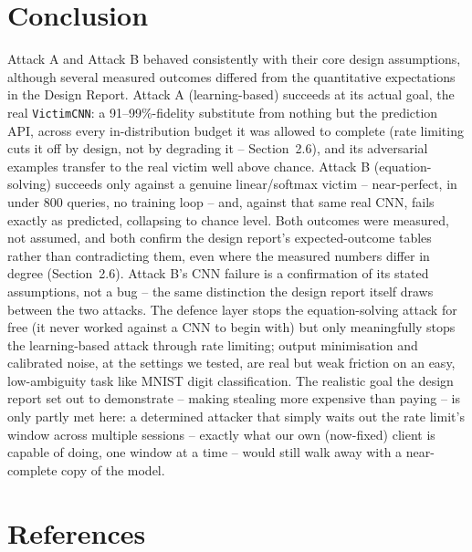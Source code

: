 \documentclass[11pt]{article}
\begin{document}
\section{Conclusion}

Attack A and Attack B behaved consistently with their core design
assumptions, although several measured outcomes differed from the
quantitative expectations in the Design Report. Attack A (learning-based) succeeds at its
actual goal, the real \texttt{VictimCNN}: a 91--99\%-fidelity substitute
from nothing but the prediction API, across every in-distribution budget it
was allowed to complete (rate limiting cuts it off by design, not by
degrading it -- Section~2.6), and its adversarial examples transfer to the
real victim well above chance. Attack B (equation-solving) succeeds only
against a genuine linear/softmax victim -- near-perfect, in under 800
queries, no training loop -- and, against that same real CNN, fails exactly
as predicted, collapsing to chance level. Both outcomes were measured, not
assumed, and both confirm the design report's expected-outcome tables rather
than contradicting them, even where the measured numbers differ in degree
(Section~2.6). Attack B's CNN failure is a confirmation of its stated
assumptions, not a bug -- the same distinction the design report itself
draws between the two attacks. The defence layer stops the equation-solving
attack for free (it never worked against a CNN to begin with) but only
meaningfully stops the learning-based attack through rate limiting; output
minimisation and
calibrated noise, at the settings we tested, are real but weak friction on
an easy, low-ambiguity task like MNIST digit classification. The realistic
goal the design report set out to demonstrate -- making stealing more
expensive than paying -- is only partly met here: a determined attacker
that simply waits out the rate limit's window across multiple sessions --
exactly what our own (now-fixed) client is capable of doing, one window at
a time -- would still walk away with a near-complete copy of the model.

\section*{References}
\end{document}
